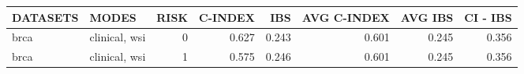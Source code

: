 \begin{tabular}{llrrrrrr}
\hline
 DATASETS   & MODES         &   RISK &   C-INDEX &   IBS &   AVG C-INDEX &   AVG IBS &   CI - IBS \\
\hline
 brca       & clinical, wsi &      0 &     0.627 & 0.243 &         0.601 &     0.245 &      0.356 \\
 brca       & clinical, wsi &      1 &     0.575 & 0.246 &         0.601 &     0.245 &      0.356 \\
\hline
\end{tabular}